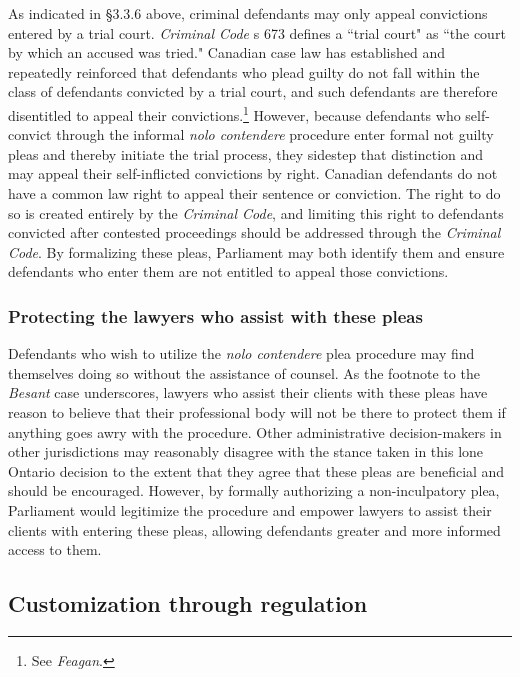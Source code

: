 As indicated in §3.3.6 above, criminal defendants may only appeal convictions entered by a trial court. \textit{Criminal Code} s 673 defines a ``trial court" as ``the court by which an accused was tried." Canadian case law has established and repeatedly reinforced that defendants who plead guilty do not fall within the class of defendants convicted by a trial court, and such defendants are therefore disentitled to appeal their convictions.\footnote{See \textit{Feagan}.} However, because defendants who self-convict through the informal \textit{nolo contendere} procedure enter formal not guilty pleas and thereby initiate the trial process, they sidestep that distinction and may appeal their self-inflicted convictions by right. Canadian defendants do not have a common law right to appeal their sentence or conviction. The right to do so is created entirely by the \textit{Criminal Code}, and limiting this right to defendants convicted after contested proceedings should be addressed through the \textit{Criminal Code}. By formalizing these pleas, Parliament may both identify them and ensure defendants who enter them are not entitled to appeal those convictions.

\subsubsection{Protecting the lawyers who assist with these pleas}

Defendants who wish to utilize the \textit{nolo contendere} plea procedure may find themselves doing so without the assistance of counsel. As the footnote to the \textit{Besant} case underscores, lawyers who assist their clients with these pleas have reason to believe that their professional body will not be there to protect them if anything goes awry with the procedure. Other administrative decision-makers in other jurisdictions may reasonably disagree with the stance taken in this lone Ontario decision to the extent that they agree that these pleas are beneficial and should be encouraged. However, by formally authorizing a non-inculpatory plea, Parliament would legitimize the procedure and empower lawyers to assist their clients with entering these pleas, allowing defendants greater and more informed access to them.

\subsection{Customization through regulation}


